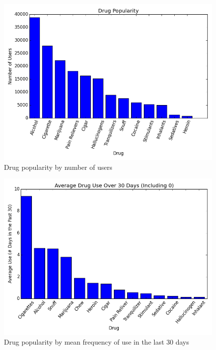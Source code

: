 \documentclass[a4 paper]{article}
\begin{document}
\begin{figure}[H]
	\centering
	\includegraphics[width=5in]{images/drugPop}
	\caption{Drug popularity by number of users}
\end{figure}

\begin{figure}[H]
	\centering
	\includegraphics[width=5in]{images/use30With0}
	\caption{Drug popularity by mean frequency of use in the last 30 days}
\end{figure}
\end{document}
